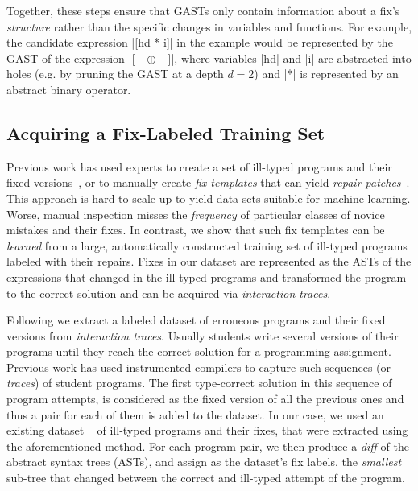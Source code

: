 Together, these steps ensure that GASTs only contain information about a fix's
\emph{structure} rather than the specific changes in variables and functions.
%
For example, the candidate expression |[hd * i]| in the \mbd example would be
represented by the GAST of the expression |[_ $\oplus$ _]|, where variables |hd|
and |i| are abstracted into holes (e.g. by pruning the GAST at a depth $d=2$)
and |*| is represented by an abstract binary operator.


\subsection{Acquiring a Fix-Labeled Training Set}
\label{sec:overview:data}

Previous work has used experts to create a set of ill-typed programs and their
fixed versions~\citep[][]{Lerner2007-dt, Loncaric2016-uk}, or to manually create
\emph{fix templates} that can yield \emph{repair
patches}~\citep[][]{martinez2013automatically,martinez2015mining}.
%
This approach is hard to scale up to yield data sets suitable for machine
learning. Worse, manual inspection misses the \emph{frequency} of particular
classes of novice mistakes and their fixes.
%
In contrast, we show that such fix templates can be \emph{learned} from a large,
automatically constructed training set of ill-typed programs labeled with their
repairs.
%
Fixes in our dataset are represented as the ASTs of the expressions that changed
in the ill-typed programs and transformed the program to the correct solution
and can be acquired via \emph{interaction traces}.

Following \citep{Seidel:2017} we extract a labeled dataset of erroneous programs
and their fixed versions from \emph{interaction traces}. Usually students write
several versions of their programs until they reach the correct solution for a
programming assignment. Previous work has used instrumented compilers to capture
such sequences (or \emph{traces}) of student programs. The first type-correct
solution in this sequence of program attempts, is considered as the fixed
version of all the previous ones and thus a pair for each of them is added to
the dataset. In our case, we used an existing dataset
~\citep[][]{yunounderstand, Seidel:2017} of ill-typed \ocaml programs and their
fixes, that were extracted using the aforementioned method. For each program
pair, we then produce a \emph{diff} of the abstract syntax trees (ASTs), and
assign as the dataset's fix labels, the \emph{smallest} sub-tree that changed
between the correct and ill-typed attempt of the program.


